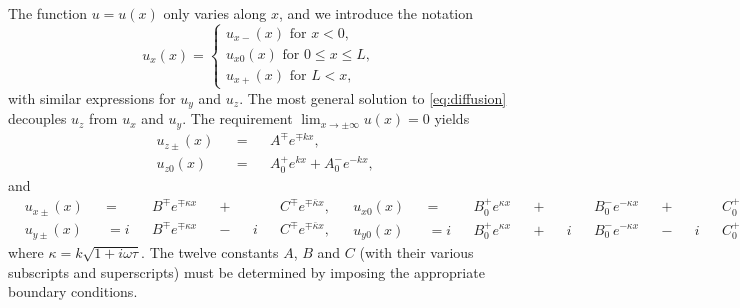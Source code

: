 The function $u = u(x)$ only varies along $x$,
and we introduce the notation
\begin{equation}
  u_x (x) =
    \begin{cases}
      u_{x-} (x) \text{ for } x < 0     , \\
      u_{x0} (x) \text{ for } 0 ≤ x ≤ L , \\
      u_{x+} (x) \text{ for }     L < x ,
    \end{cases}
\end{equation}
with similar expressions for $u_y$ and $u_z$.
The most general solution to \cref{eq:diffusion} decouples $u_z$ from $u_x$ and $u_y$.
The requirement $\lim_{x → ± ∞} u(x) = 0$ yields
\begin{subequations}
  \begin{alignat}{3}
    & u_{z±} (x) && {}={} && A^∓ e^{∓ k x}                     , \\
    & u_{z0} (x) && {}={} && A_0^+ e^{k x} {}+{} A_0^- e^{-k x} ,
  \end{alignat}
\end{subequations}
and
\begin{subequations}
  \begin{alignat}{6}
    & u_{x±} (x) && =   && B^∓ e^{∓ κ x} && {}+{} &&   && C^∓ e^{∓ \bar{κ} x} , \\
    & u_{y±} (x) && = i && B^∓ e^{∓ κ x} && {}-{} && i && C^∓ e^{∓ \bar{κ} x} ,
  \end{alignat}
  \begin{alignat}{12}
    & u_{x0} (x) && =   && B_0^+ e^{κ x} && {}+{} &&   && B_0^- e^{- κ x} && {}+{} &&   && C_0^+ e^{ \bar{κ} x } && {}+{} &&   && C_0^- e^{ - \bar{κ} x } , \\
    & u_{y0} (x) && = i && B_0^+ e^{κ x} && {}+{} && i && B_0^- e^{- κ x} && {}-{} && i && C_0^+ e^{ \bar{κ} x } && {}-{} && i && C_0^- e^{ - \bar{κ} x } ,
  \end{alignat}
\end{subequations}
where $κ = k \sqrt{1 + i ω τ}$.
The twelve constants $A$, $B$ and $C$ (with their various subscripts and superscripts) must be determined by imposing the appropriate boundary conditions.

